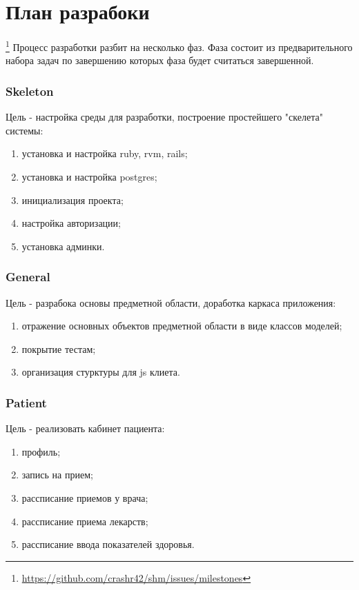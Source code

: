 \section{План разрабоки}\footnote{
	\url{https://github.com/crashr42/shm/issues/milestones}
}
Процесс разработки разбит на несколько фаз. Фаза состоит из предварительного
набора задач по завершению которых  фаза будет считаться завершенной.

\subsubsection{Skeleton}
Цель - настройка среды для разработки, построение простейшего "скелета" системы:
\begin{enumerate}
  \item установка и настройка ruby, rvm, rails;
  \item установка и настройка postgres;
  \item инициализация проекта;
  \item настройка авторизации;
  \item установка админки.
\end{enumerate}

\subsubsection{General}
Цель - разрабока основы предметной области, доработка каркаса приложения:
\begin{enumerate}
  \item отражение основных объектов предметной области в виде классов моделей;
  \item покрытие тестам;
  \item организация стурктуры для js клиета.
\end{enumerate}

\subsubsection{Patient}
Цель - реализовать кабинет пациента:
\begin{enumerate}
  \item профиль;
  \item запись на прием;
  \item рассписание приемов у врача;
  \item рассписание приема лекарств;
  \item рассписание ввода показателей здоровья.   
\end{enumerate}

